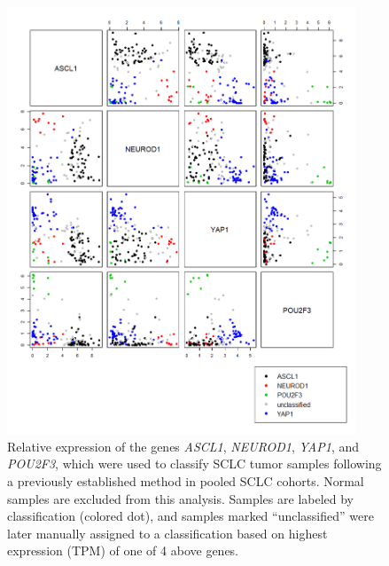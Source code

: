 \begin{figure}[p]
    \centering
    \includegraphics[width=0.93\textwidth,keepaspectratio]{images/sclc/classification_scatter}
    \vspace{-0.5cm}
    \caption[Relative expression of SCLC subtype-defining genes.]{Relative expression of the genes \textit{ASCL1}, \textit{NEUROD1}, \textit{YAP1}, and \textit{POU2F3}, which were used to classify SCLC tumor samples following a previously established method \cite{rudin2019} in pooled SCLC cohorts. Normal samples are excluded from this analysis. Samples are labeled by classification (colored dot), and samples marked ``unclassified'' were later manually assigned to a classification based on highest expression (TPM) of one of 4 above genes.}
    \label{fig:sclc:classification_scatter}
\end{figure}

